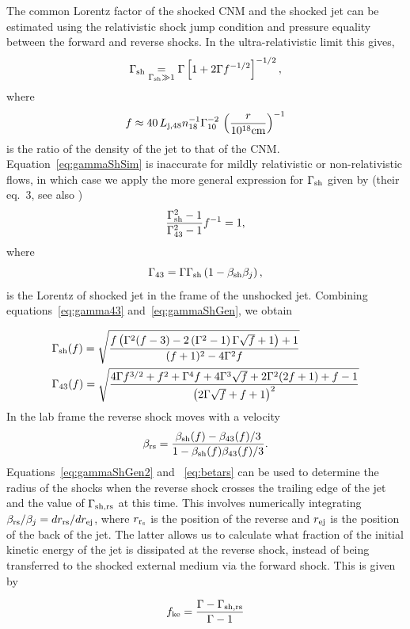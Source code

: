 \documentclass[usenatbib,fleqn]{mnras}
\newcommand{\rs}{r_s}
\begin{document}
The common Lorentz factor of the shocked CNM and the shocked jet can
be estimated using the relativistic shock jump condition and pressure
equality between the forward and reverse shocks.  In the
ultra-relativistic limit this gives,
\begin{equation}
\Gamma_{\rm sh} \underset{\Gamma_{\rm sh} \gg 1}= \Gamma\left[1 +
  2\Gamma f^{-1/2}\right]^{-1/2},
\label{eq:gammaShSim}
\end{equation}
where
\begin{equation}
  f\approx 40\,  L_{\rm j,48} n_{18}^{-1} \Gamma_{10}^{-2} \, \left(\frac{r}{10^{18} {\rm
        cm}}\right)^{-1} 
\end{equation}
is the ratio of the density of the jet to that of the
CNM. Equation~\eqref{eq:gammaShSim} is inaccurate for mildly relativistic or
non-relativistic flows, in which case we apply the more general
expression for $\Gamma_{\rm sh}$ given by \citet{Beloborodov&Uhm2006}
(their eq.~3, see also \citealt{Mimica&Aloy2010})
\begin{equation}
\frac{\Gamma_{\rm sh}^2-1}{\Gamma_{43}^2-1} f^{-1}=1 ,
\label{eq:gamma43}
\end{equation}
where
\begin{equation}
  \Gamma_{43}=\Gamma \Gamma_{\rm sh} \left(1-\beta_{\rm sh} \beta_j\right),
\label{eq:gammaShGen}
\end{equation}
is the Lorentz of shocked jet in the frame of the unshocked
jet. Combining equations~\eqref{eq:gamma43}
and~\eqref{eq:gammaShGen}, we obtain 

\begin{align}
&\Gamma_{\rm sh}(f)=\sqrt{\frac{f \left(\Gamma ^2 (f-3)-2 \left(\Gamma ^2-1\right) \Gamma
      \sqrt{f}+1\right)+1}{(f+1)^2-4 \Gamma ^2 f}}\nonumber\\
&\Gamma_{43}(f) = \sqrt{\frac{4 \Gamma  f^{3/2}+f^2+\Gamma ^4 f+4 \Gamma ^3 \sqrt{f}+2 \Gamma ^2 (2 f+1)+f-1}{\left(2 \Gamma  \sqrt{f}+f+1\right)^2}}
\label{eq:gammaShGen2}
\end{align}
%
In the lab frame the reverse shock moves with a velocity
\begin{equation}
\beta_{\rm rs}=\frac{\beta_{\rm sh}(f)-\beta_{43}(f)/3}{1-\beta_{\rm
    sh}(f) \beta_{43}(f)/3}.
\label{eq:betars}
\end{equation} 
%
Equations~\eqref{eq:gammaShGen2} and ~\eqref{eq:betars} can be used to
determine the radius of the shocks when the reverse shock crosses the
trailing edge of the jet and the value of $\Gamma_{\rm sh, rs}$ at this
time.  This involves numerically integrating $\beta_{\rm
  rs}/\beta_{j}=d r_{\rm rs}/d r_{\rm ej}$, where $r_{\rm \rs}$ is the
position of the reverse and $r_{\rm ej}$ is the position of the back
of the jet. The latter allows us to calculate what fraction of the
initial kinetic energy of the jet is dissipated at the reverse shock,
instead of being transferred to the shocked external medium via the
forward shock. This is given by

\begin{equation}
f_{\rm ke}=\frac{\Gamma-\Gamma_{\rm sh, rs}}{\Gamma-1}
\end{equation}



\clearpage
  \footnotesize{
    
    
  }
\end{document}
